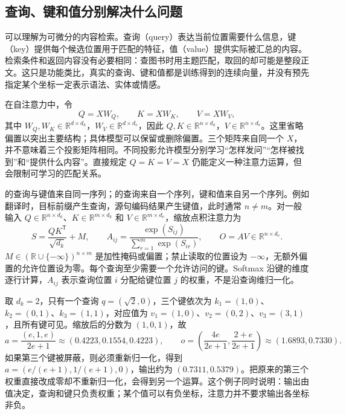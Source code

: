 \documentclass[UTF8,12pt,a4paper,fontset=fandol]{ctexart}
\begin{document}
\subsection{查询、键和值分别解决什么问题}

可以理解为可微分的内容检索。查询（query）表达当前位置需要什么信息，键（key）提供每个候选位置用于匹配的特征，值（value）提供实际被汇总的内容。检索条件和返回内容没有必要相同：查图书时用主题匹配，取回的却可能是整段正文。这只是功能类比，真实的查询、键和值都是训练得到的连续向量，并没有预先指定某个坐标一定表示语法、实体或情感。

在自注意力中，令
\begin{equation}
Q=XW_Q,\qquad K=XW_K,\qquad V=XW_V,
\label{eq:tr-qkv}
\end{equation}
其中 $W_Q,W_K\in\mathbb R^{d\times d_k}$，$W_V\in\mathbb R^{d\times d_v}$，因此 $Q,K\in\mathbb R^{n\times d_k}$，$V\in\mathbb R^{n\times d_v}$。这里省略偏置以突出主要结构；具体模型可以保留或删除偏置。三个矩阵来自同一个 $X$，并不意味着三个投影矩阵相同。不同投影允许模型分别学习“怎样发问”“怎样被找到”和“提供什么内容”。直接规定 $Q=K=V=X$ 仍能定义一种注意力运算，但会限制可学习的匹配关系。

的查询与键值来自同一序列；的查询来自一个序列，键和值来自另一个序列。例如翻译时，目标前缀产生查询，源句编码结果产生键值，此时通常 $n\ne m$。对一般输入 $Q\in\mathbb R^{n\times d_k}$、$K\in\mathbb R^{m\times d_k}$ 和 $V\in\mathbb R^{m\times d_v}$，缩放点积注意力为
\begin{equation}
S=\frac{QK^{\mathsf T}}{\sqrt{d_k}}+M,\qquad
A_{ij}=\frac{\exp(S_{ij})}{\sum_{r=1}^{m}\exp(S_{ir})},\qquad
O=AV\in\mathbb R^{n\times d_v}.
\label{eq:tr-attention}
\end{equation}
$M\in(\mathbb R\cup\{-\infty\})^{n\times m}$ 是加性掩码或偏置；禁止读取的位置设为 $-\infty$，无额外偏置的允许位置设为零。每个查询至少需要一个允许访问的键。Softmax 沿键的维度逐行计算，$A_{ij}$ 表示查询位置 $i$ 分配给键位置 $j$ 的权重，不是沿查询维归一化。

\begin{example}[一次完整的注意力计算]
取 $d_k=2$，只有一个查询 $q=(\sqrt2,0)$，三个键依次为 $k_1=(1,0)$、$k_2=(0,1)$、$k_3=(1,1)$，对应值为 $v_1=(1,0)$、$v_2=(0,2)$、$v_3=(3,1)$，且所有键可见。缩放后的分数为 $(1,0,1)$，故
\[
a=\frac{(e,1,e)}{2e+1}\approx(0.4223,0.1554,0.4223),
\qquad
o=\left(\frac{4e}{2e+1},\frac{2+e}{2e+1}\right)
\approx(1.6893,0.7330).
\]
如果第三个键被屏蔽，则必须重新归一化，得到 $a=(e/(e+1),1/(e+1),0)$，输出约为 $(0.7311,0.5379)$。把原来的第三个权重直接改成零却不重新归一化，会得到另一个运算。这个例子同时说明：输出由值决定，查询和键只负责权重；某个值可以有负坐标，注意力并不要求输出各坐标非负。
\end{example}
\end{document}
